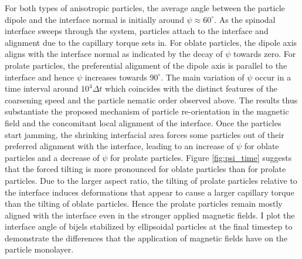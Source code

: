 For both types of anisotropic particles, the average angle between the
particle dipole and the interface normal is initially around
\(\psi\approx60^\circ\). As the spinodal interface sweeps through the
system, particles attach to the interface and alignment due to the
capillary torque sets in. For oblate particles, the dipole axis aligns
with the interface normal as indicated by the decay of \(\psi\) towards
zero. For prolate particles, the preferential alignment of the dipole
axis is parallel to the interface and hence \(\psi\) increases towards
\(90^\circ\). The main variation of \(\psi\) occur in a time interval
around \(10^4\Delta t\) which coincides with the distinct features of
the coarsening speed and the particle nematic order observed above. The
results thus substantiate the proposed mechanism of particle
re-orientation in the magnetic field and the concomitant local alignment
of the interface. Once the particles start jamming, the shrinking
interfacial area forces some particles out of their preferred alignment
with the interface, leading to an increase of \(\psi\) for oblate
particles and a decrease of \(\psi\) for prolate particles. Figure
\ref{fig:psi_time} suggests that the forced tilting is more pronounced
for oblate particles than for prolate particles. Due to the larger
aspect ratio, the tilting of prolate particles relative to the interface
induces deformations that appear to cause a larger capillary torque than
the tilting of oblate particles. %
Hence the prolate particles remain mostly aligned with the interface
even in the stronger applied magnetic fields. I plot the interface angle of bijels
stabilized by ellipsoidal particles at the final timestep to demonstrate the differences
that the application of magnetic fields have on the particle monolayer.

